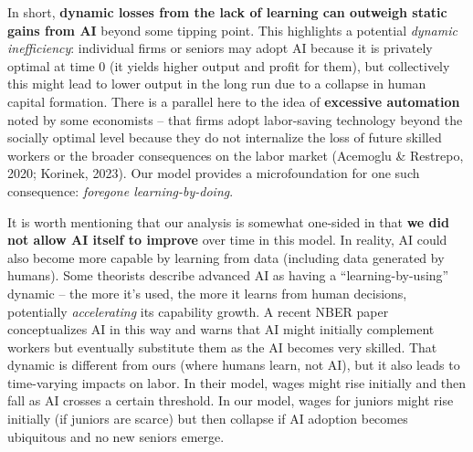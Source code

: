\documentclass[12pt]{article}
\begin{document}
In short, \textbf{dynamic losses from the lack of learning can outweigh
static gains from AI} beyond some tipping point. This highlights a
potential \emph{dynamic inefficiency}: individual firms or seniors may
adopt AI because it is privately optimal at time 0 (it yields higher
output and profit for them), but collectively this might lead to lower
output in the long run due to a collapse in human capital formation.
There is a parallel here to the idea of \textbf{excessive automation}
noted by some economists -- that firms adopt labor-saving technology
beyond the socially optimal level because they do not internalize the
loss of future skilled workers or the broader consequences on the labor
market (Acemoglu \& Restrepo, 2020; Korinek, 2023). Our model provides a
microfoundation for one such consequence: \emph{foregone
learning-by-doing}.

It is worth mentioning that our analysis is somewhat one-sided in that
\textbf{we did not allow AI itself to improve} over time in this model.
In reality, AI could also become more capable by learning from data
(including data generated by humans). Some theorists describe advanced
AI as having a ``learning-by-using'' dynamic -- the more it's used, the
more it learns from human decisions, potentially \emph{accelerating} its
capability growth. A recent NBER paper conceptualizes AI in this way and
warns that AI might initially complement workers but eventually
substitute them as the AI becomes very skilled. That dynamic is
different from ours (where humans learn, not AI), but it also leads to
time-varying impacts on labor. In their model, wages might rise
initially and then fall as AI crosses a certain threshold. In our model,
wages for juniors might rise initially (if juniors are scarce) but then
collapse if AI adoption becomes ubiquitous and no new seniors emerge.
\end{document}
